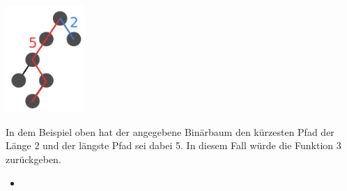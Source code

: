 \includegraphics[width=3cm]{2022_11_23_3d3b162f8463b52386b8g-3}

In dem Beispiel oben hat der angegebene Binärbaum den kürzesten Pfad der Länge 2 und der längste Pfad sei dabei 5. In diesem Fall würde die Funktion 3 zurückgeben.

\begin{itemize}
  \item []\inputminted{Haskell}{A6_5.hs}
\end{itemize}

